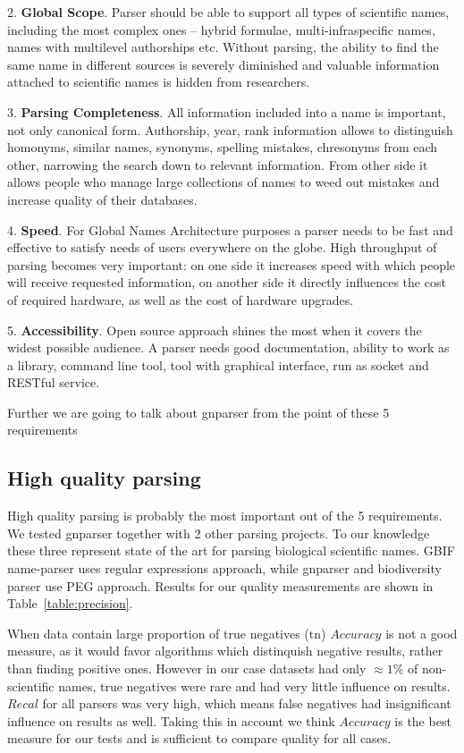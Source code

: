 \documentclass{bmcart}
\begin{document}
2. \textbf{Global Scope}. Parser should be able to support all types of
scientific names, including the most complex ones -- hybrid formulae,
multi-infraspecific names, names with multilevel authorships etc. Without
parsing, the ability to find the same name in different sources is severely
diminished and valuable information attached to scientific names is hidden
from researchers.

3. \textbf{Parsing Completeness}. All information included into a name is
important, not only canonical form. Authorship, year, rank information allows
to distinguish homonyms, similar names, synonyms, spelling mistakes,
chresonyms from each other, narrowing the search down to relevant information.
From other side it allows people who manage large collections of names to weed
out mistakes and increase quality of their databases.

4. \textbf{Speed}. For Global Names Architecture purposes a parser needs to be
fast and effective to satisfy needs of users everywhere on the globe.  High
throughput of parsing becomes very important: on one side it increases speed
with which people will receive requested information, on another side it
directly influences the cost of required hardware, as well as the cost of
hardware upgrades.

5. \textbf{Accessibility}. Open source approach shines the most when it covers
the widest possible audience. A parser needs good documentation, ability to
work as a library, command line tool, tool with graphical interface, run as
socket and RESTful service.

Further we are going to talk about gnparser from the point of these 5
requirements

\subsection*{High quality parsing}

High quality parsing is probably the most important out of the 5 requirements.
We tested gnparser together with 2 other parsing projects. To our knowledge
these three represent state of the art for parsing biological scientific
names. GBIF name-parser uses regular expressions approach, while gnparser and
biodiversity parser use PEG approach. Results for our quality measurements are
shown in Table~\ref{table:precision}.

When data contain large proportion of true negatives ($\text{tn}$) $Accuracy$
is not a good measure, as it would favor algorithms which distinquish negative
results, rather than finding positive ones. However in our case datasets had
only $\approx1\%$ of non-scientific names, true negatives were rare and had
very little influence on results. $Recal$ for all parsers was very high, which
means false negatives had insignificant influence on results as well. Taking
this in account we think $Accuracy$ is the best measure for our tests and
is sufficient to compare quality for all cases.
\end{document}
